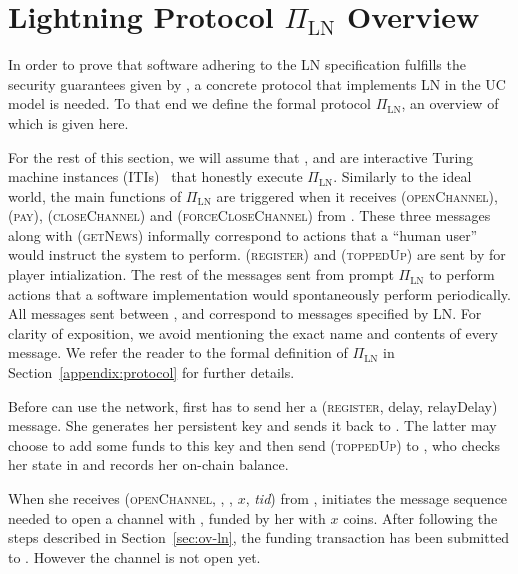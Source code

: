 \section{Lightning Protocol $\Pi_{\mathrm{LN}}$ Overview}
\label{sec:ov-protocol}

  In order to prove that software adhering to the LN specification
  fulfills the security guarantees given by \fpaynet, a concrete
  protocol that implements LN in the UC model is needed. To that end we
  define the formal protocol $\Pi_{\mathrm{LN}}$, an overview of which is given
  here.

  For the rest of this section, we will assume that \alice, \bob{} and
  \charlie{} are interactive Turing machine instances (ITIs)~\cite{uc}
  that honestly execute $\Pi_{\mathrm{LN}}$. Similarly to the ideal world, the
  main functions of $\Pi_{\mathrm{LN}}$ are triggered when it receives
  (\textsc{openChannel}), (\textsc{pay}), (\textsc{closeChannel}) and
  (\textsc{forceCloseChannel}) from \environment{}. These three messages along
  with (\textsc{getNews}) informally correspond to actions that a ``human user''
  would instruct the system to perform. (\textsc{register}) and
  (\textsc{toppedUp}) are sent by \environment{} for player intialization. The
  rest of the messages sent from \environment{} prompt $\Pi_{\mathrm{LN}}$ to
  perform actions that a software implementation would spontaneously perform
  periodically. All messages sent between \alice, \bob{} and \charlie{}
  correspond to messages specified by LN. For clarity of exposition, we avoid
  mentioning the exact name and contents of every message. We refer the reader
  to the formal definition of $\Pi_{\mathrm{LN}}$ in
  Section~\ref{appendix:protocol} for further
  details.

    Before \alice{} can use the network, \environment{} first has to send her a
    (\textsc{register}, delay, relayDelay) message. She generates her
    persistent key and sends it back to \environment{}. The latter may choose to
    add some funds to this key and then send (\textsc{toppedUp}) to \alice, who
    checks her state in \ledger{} and records her on-chain balance.

    When she receives (\textsc{openChannel}, \alice, \bob, $x$, \textit{tid})
    from \environment, \alice{} initiates the message sequence needed to open a
    channel with \bob, funded by her with $x$ coins. After following the
    steps described in Section~\ref{sec:ov-ln}, the funding transaction has been
    submitted to \ledger. However the channel is not open yet.

